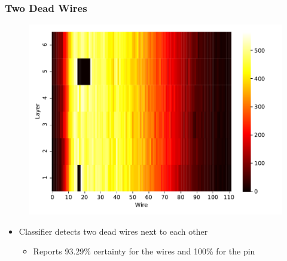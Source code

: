 \begin{frame}
  \frametitle{Two Dead Wires}
  \begin{figure}
    \includegraphics[width=.64\textwidth]{../figures/two_wires}
  \end{figure}
  \begin{itemize}
    \item Classifier detects two dead wires next to each other
      \begin{itemize}
        \item Reports 93.29\% certainty for the wires and 100\% for
          the pin
      \end{itemize}
  \end{itemize}
\end{frame}
